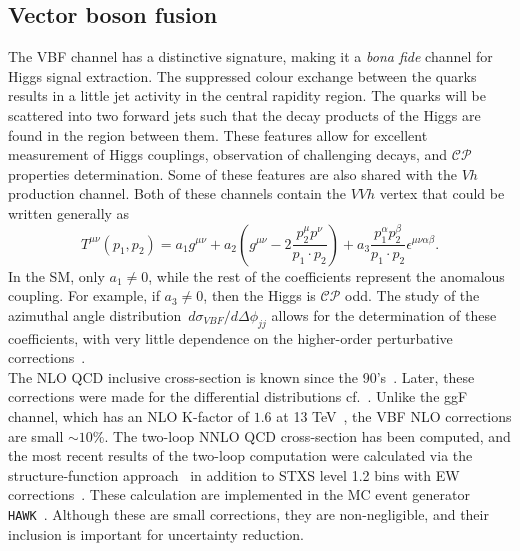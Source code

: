 \subsection{Vector boson fusion}
The VBF channel has a distinctive signature, making it a\textit{ bona fide} channel for Higgs signal extraction. The suppressed colour exchange between the quarks results in a little jet activity in the central rapidity region. The quarks will be scattered into two forward jets such that the decay products of the Higgs are found in the region between them.  These features allow for excellent measurement of Higgs couplings, observation of challenging decays, and $\mathcal{CP}$ properties determination. Some of these features are also shared with the $Vh$ production channel. Both of these channels contain the $VVh$ vertex that could be written generally as~\cite{LHCHiggsCrossSectionWorkingGroup:2016ypw}
\begin{equation}
	T^{\mu \nu}(p_1,p_2) = a_1 g^{\mu \nu}+ a_2  \left(g^{\mu \nu}- 2\frac{p^\mu_{2} p^\nu }{p_1 \cdot p_2} \right)  + a_3 \frac{p_1^\alpha p_2^ \beta}{p_1 \cdot p_2}\epsilon^{\mu \nu \alpha \beta}. 
\end{equation} 
In the SM, only $a_1\neq0$, while the rest of the coefficients represent the anomalous coupling. For example, if $a_3 \neq0$, then the Higgs is  $\mathcal{CP}$ odd. The study of the azimuthal angle distribution~$d \sigma_{VBF} / d \Delta \phi_{jj}$ allows for the determination of these coefficients, with very little dependence on the higher-order perturbative corrections~\cite{hankele2006anomalous}.\\  The NLO QCD inclusive cross-section is known since the 90's~\cite{Han:1992hr}. Later, these corrections were made for the differential distributions cf.~\cite{Figy:2003nv,Berger:2004pca}. Unlike the ggF channel, which has an NLO  K-factor of $1.6$ at 13 TeV~\cite{Gomez-Bock:2007azi}, the VBF NLO corrections are small $\sim 10\%$. The two-loop NNLO QCD cross-section has been computed, and the most recent results of the two-loop computation were calculated via the structure-function approach~\cite{Bolzoni:2010xr} in addition to STXS level 1.2 bins with EW corrections~\cite{Denner:2014cla}. These calculation are implemented in the MC event generator  \texttt{HAWK}~\cite{Ciccolini:2007jr,Denner:2011id,Denner:2014cla,Denner:2018opp}. Although these are small corrections, they are non-negligible, and their inclusion is important for uncertainty reduction.
